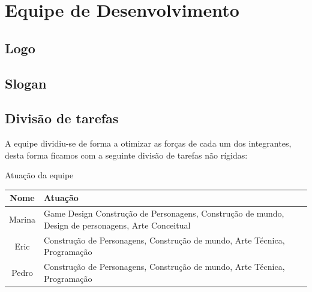 \section{Equipe de Desenvolvimento}

\subsection{Logo}

\subsection{Slogan}

\subsection{Divisão de tarefas}

A equipe dividiu-se de forma a
otimizar as forças de cada um dos integrantes, desta forma ficamos com a
seguinte divisão de tarefas não rígidas:

\begin{quadro}[htb] \caption{\label{quadro_atuacao}Atuação da equipe}
    \begin{tabularx}{\textwidth}{|c|X|} \hline \textbf{Nome} &
        \textbf{Atuação}\\ \hline Marina & Game Design Construção de
        Personagens, Construção de mundo, Design de personagens, Arte Conceitual
        \\ \hline Eric   & Construção de Personagens, Construção de mundo, Arte
        Técnica, Programação                                        \\ \hline
        Pedro  & Construção de Personagens, Construção de mundo, Arte Técnica,
        Programação \\ \hline \end{tabularx} 
\end{quadro}
